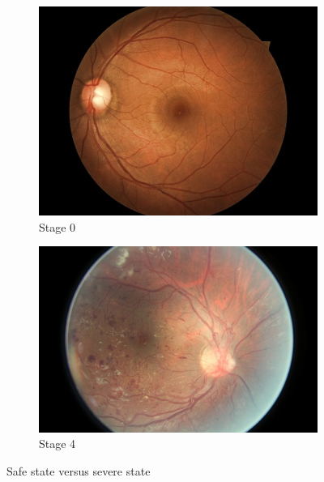 \documentclass[12pt]{report}
\begin{document}
\begin{figure}[htpb]
	\centering
	\begin{subfigure}{.5\textwidth}
		\centering
		\includegraphics[width=.98\linewidth, height=.75\linewidth]{eye0}
		\caption{Stage 0}
		\label{eye0}
	\end{subfigure}%
	\begin{subfigure}{.5\textwidth}
		\centering
		\includegraphics[width=.98\linewidth, height=.75\linewidth]{eye4}
		\caption{Stage 4}
		\label{eye4}
	\end{subfigure}
	\caption{Safe state versus severe state}
	\label{states}
\end{figure}
\end{document}
